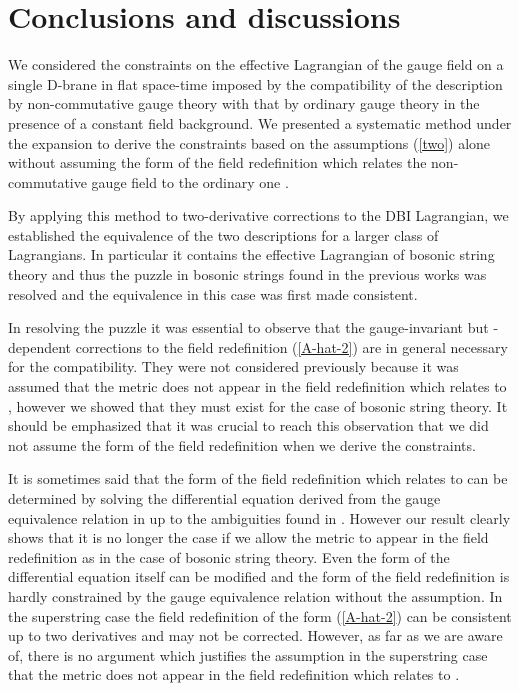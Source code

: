 \documentclass[a4paper,12pt]{article}
\begin{document}
\section{Conclusions and discussions}
\setcounter{equation}{0}
\indent

We considered the constraints on the effective Lagrangian
of the gauge field on a single D-brane in flat space-time
imposed by the compatibility of the description
by non-commutative gauge theory \coordHE{}
with that by ordinary gauge theory \coordHE{}
in the presence of a constant \coordHE{} field background.
We presented a systematic method
under the \coordHE{} expansion to derive
the constraints based on the assumptions (\ref{two}) alone
without assuming the form of the field redefinition
which relates the non-commutative gauge field \coordHE{}
to the ordinary one \coordHE{}.

By applying this method to two-derivative corrections
to the DBI Lagrangian,
we established the equivalence of the two descriptions
for a larger class of Lagrangians.
In particular it contains the effective Lagrangian of bosonic
string theory and thus
the puzzle in bosonic strings
found in the previous works was resolved
and the equivalence in this case was first made consistent.

In resolving the puzzle it was essential to observe
that the gauge-invariant but \coordHE{}-dependent corrections
to the field redefinition (\ref{A-hat-2})
are in general necessary for the compatibility.
They were not considered previously because it was assumed that
the metric \coordHE{} does not appear in the field redefinition
which relates \coordHE{} to \coordHE{},
however we showed
that they must exist for the case of bosonic string theory.
It should be emphasized that
it was crucial to reach this observation that
we did not assume the form of the field redefinition
when we derive the constraints.

It is sometimes said that the form of the field redefinition
which relates \coordHE{} to \coordHE{}
can be determined by solving the differential equation
derived from the gauge equivalence relation
in \cite{SW} up to the ambiguities found in \cite{AK}.
However our result clearly shows that
it is no longer the case if we allow the metric \coordHE{}
to appear in the field redefinition
as in the case of bosonic string theory.
Even the form of the differential equation itself can be modified
and the form of the field redefinition is hardly constrained
by the gauge equivalence relation without the assumption.
In the superstring case the field redefinition of the form
(\ref{A-hat-2}) can be consistent
up to two derivatives \cite{Terashima}
and may not be corrected.
However, as far as we are aware of,
there is no argument which justifies the assumption
in the superstring case
that the metric \coordHE{} does not appear in the field redefinition
which relates \coordHE{} to \coordHE{}.
\end{document}
